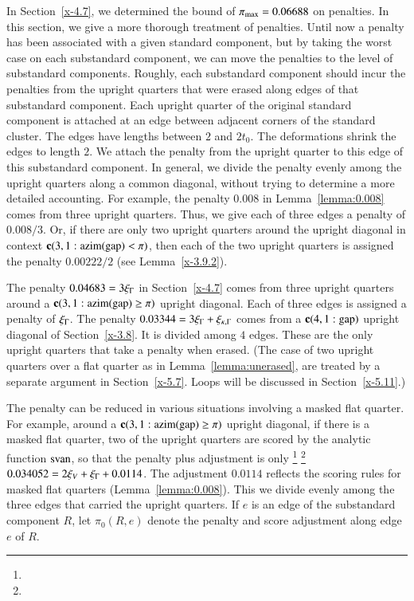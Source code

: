 In Section~\ref{x-4.7}, we determined the bound of
$\pi_{\max}=0.06688$ on penalties. In this section, we give a more
thorough treatment of penalties. Until now a penalty has been
associated with a given standard component, but by taking the worst
case on each substandard component, we can move the penalties to the level of
substandard components.   Roughly, each substandard component should incur the penalties
from the upright quarters that were erased along edges of that
substandard component.  Each upright quarter of the original standard component
is attached at an edge between adjacent corners of the standard
cluster. The edges have lengths between $2$ and $2t_0$.  The
deformations shrink the edges to length $2$.  We attach the
penalty from the upright quarter to this edge of this substandard component.
In general, we divide the penalty evenly among the upright
quarters along a common diagonal, without trying to determine a
more detailed accounting. For example, the penalty $0.008$ in
Lemma~\ref{lemma:0.008} comes from three upright quarters.  Thus,
we give each of three edges a penalty of $0.008/3$. Or, if there
are only two upright quarters around the  upright
diagonal in context ${\operatorname{\bf c}}{(3,1: {\operatorname{azim}}({\operatorname{gap}}) <\pi)}$, 
then each of the two upright quarters is assigned the
penalty $0.00222/2$ (see Lemma~\ref{x-3.9.2}).

The penalty $0.04683 = 3\xi_\Gamma$ in Section~\ref{x-4.7} comes from
three upright quarters around a ${\operatorname{\bf c}}{(3,1: {\operatorname{azim}}({\operatorname{gap}}) \ge \pi)}$ upright diagonal. Each
of three edges is assigned a penalty of $\xi_\Gamma$.  The penalty
$0.03344=3\xi_\Gamma+\xi_{\kappa,\Gamma}$ comes from a ${\operatorname{\bf c}}{(4,1:{\operatorname{gap}})}$ upright diagonal of
Section~\ref{x-3.8}. It is divided among $4$ edges. These are the
only upright quarters that take a penalty when erased. (The case
of two upright quarters over a flat quarter as in
Lemma~\ref{lemma:unerased}, are treated by a separate argument in
Section~\ref{x-5.7}. Loops will be discussed in
Section~\ref{x-5.11}.)

The penalty can be reduced in various situations involving a
masked flat quarter.  For example, around a ${\operatorname{\bf c}}{(3,1: {\operatorname{azim}}({\operatorname{gap}}) \ge \pi)}$ upright
diagonal, if there is a masked flat quarter, two of the upright
quarters are scored by the analytic  function ${\operatorname{svan}}$, so that the
penalty plus adjustment is only%
\footnote{} %
\footnote{} %
 $0.034052=2\xi_V+\xi_\Gamma+0.0114$.
The adjustment $0.0114$ reflects the scoring
rules for masked flat quarters (Lemma~\ref{lemma:0.008}).  This we
divide evenly among the three edges that carried the upright
quarters. If $e$ is an edge of the substandard component $R$, let $\pi_0(R,e)$
denote the penalty and score adjustment along edge $e$ of $R$.

